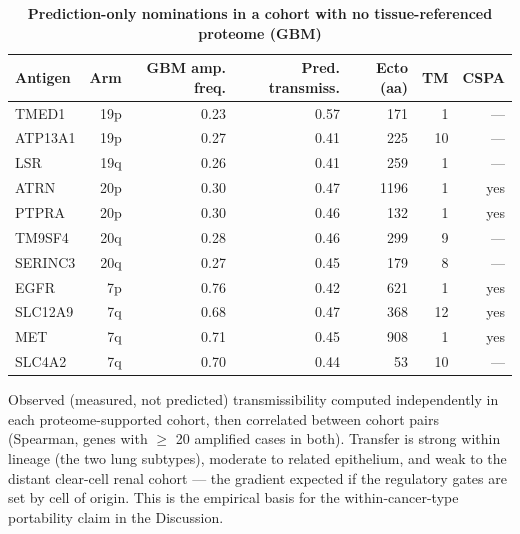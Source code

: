 \documentclass[times, twoside]{zHenriquesLab-StyleBioRxiv}
\begin{document}
\begin{table}[tbp]
\centering
{\scriptsize
\begin{tabular}{@{}lrrrrrr@{}}
\toprule
\textbf{Antigen} & \textbf{Arm} & \textbf{GBM amp. freq.} & \textbf{Pred. transmiss.} & \textbf{Ecto (aa)} & \textbf{TM} & \textbf{CSPA} \\
\midrule
TMED1 & 19p & 0.23 & 0.57 & 171 & 1 & --- \\
ATP13A1 & 19p & 0.27 & 0.41 & 225 & 10 & --- \\
LSR & 19q & 0.26 & 0.41 & 259 & 1 & --- \\
ATRN & 20p & 0.30 & 0.47 & 1196 & 1 & yes \\
PTPRA & 20p & 0.30 & 0.46 & 132 & 1 & yes \\
TM9SF4 & 20q & 0.28 & 0.46 & 299 & 9 & --- \\
SERINC3 & 20q & 0.27 & 0.45 & 179 & 8 & --- \\
EGFR & 7p & 0.76 & 0.42 & 621 & 1 & yes \\
SLC12A9 & 7q & 0.68 & 0.47 & 368 & 12 & yes \\
MET & 7q & 0.71 & 0.45 & 908 & 1 & yes \\
SLC4A2 & 7q & 0.70 & 0.44 & 53 & 10 & --- \\
\bottomrule
\end{tabular}
}
\caption{\textbf{Prediction-only nominations in a cohort with no tissue-referenced proteome (GBM)}}
\label{tab:gbm}
\end{table}
Observed (measured, not predicted) transmissibility computed independently in each proteome-supported cohort, then correlated between cohort pairs (Spearman, genes with $\geq$ 20 amplified cases in both). Transfer is strong within lineage (the two lung subtypes), moderate to related epithelium, and weak to the distant clear-cell renal cohort --- the gradient expected if the regulatory gates are set by cell of origin. This is the empirical basis for the within-cancer-type portability claim in the Discussion.
\end{document}
